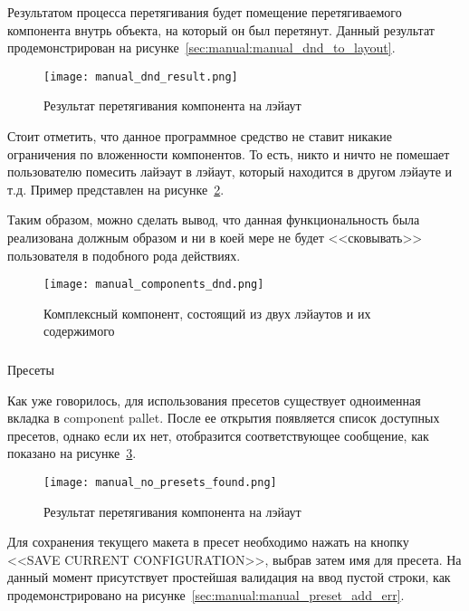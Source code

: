 Результатом процесса перетягивания будет помещение перетягиваемого компонента внутрь объекта, на который он был перетянут. Данный результат продемонстрирован на рисунке~\ref{sec:manual:manual_dnd_to_layout}.

\begin{figure}[ht]
  \centering
    \texttt{[image: manual\_dnd\_result.png]}
    \caption{Результат перетягивания компонента на лэйаут}
    \label{sec:manual:manual_dnd_result}
\end{figure}

Стоит отметить, что данное программное средство не ставит никакие ограничения по вложенности компонентов. То есть, никто и ничто не помешает пользователю помесить лайэаут в лэйаут, который находится в другом лэйауте и т.д. Пример представлен на рисунке~\ref{sec:manual:manual_components_dnd}.

Таким образом, можно сделать вывод, что данная функциональность была реализована должным образом и ни в коей мере не будет <<сковывать>> пользователя в подобного рода действиях.

\begin{figure}[ht]
  \centering
    \texttt{[image: manual\_components\_dnd.png]}
    \caption{Комплексный компонент, состоящий из двух лэйаутов и их содержимого}
    \label{sec:manual:manual_components_dnd}
\end{figure}

\subsubsection{}Пресеты
\

Как уже говорилось, для использования пресетов существует одноименная вкладка в component pallet. После ее открытия появляется список доступных пресетов, однако если их нет, отобразится соответствующее сообщение, как показано на рисунке~\ref{sec:manual:manual_no_presets_found}.

\begin{figure}[ht]
\centering
    \texttt{[image: manual\_no\_presets\_found.png]}
    \caption{Результат перетягивания компонента на лэйаут}
    \label{sec:manual:manual_no_presets_found}
\end{figure}

\pagebreak
Для сохранения текущего макета в пресет необходимо нажать на кнопку <<SAVE CURRENT CONFIGURATION>>, выбрав затем имя для пресета. На данный момент присутствует простейшая валидация на ввод пустой строки, как продемонстрировано на рисунке~\ref{sec:manual:manual_preset_add_err}.

